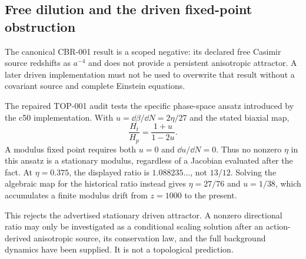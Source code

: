 \subsection{Free dilution and the driven fixed-point obstruction}

The canonical CBR-001 result is a scoped negative: its declared free Casimir
source redshifts as $a^{-4}$ and does not provide a persistent anisotropic
attractor.  A later driven implementation must not be used to overwrite that
result without a covariant source and complete Einstein equations.

The repaired TOP-001 audit tests the specific phase-space ansatz introduced by
the c50 implementation.  With $u=\dd\beta/\dd N=2\eta/27$ and the stated
biaxial map,
\begin{equation}
 \frac{H_t}{H_p}=\frac{1+u}{1-2u}.
 \label{eq:driven-ratio-audit}
\end{equation}
A modulus fixed point requires both $u=0$ and $\dd u/\dd N=0$.  Thus no
nonzero $\eta$ in this ansatz is a stationary modulus, regardless of a
Jacobian evaluated after the fact.  At $\eta=0.375$, the displayed ratio is
$1.088235\ldots$, not $13/12$.  Solving the algebraic map for the historical
ratio instead gives $\eta=27/76$ and $u=1/38$, which accumulates a finite
modulus drift from $z=1000$ to the present.

This rejects the advertised stationary driven attractor.  A nonzero
directional ratio may only be investigated as a conditional scaling solution
after an action-derived anisotropic source, its conservation law, and the full
background dynamics have been supplied.  It is not a topological prediction.
